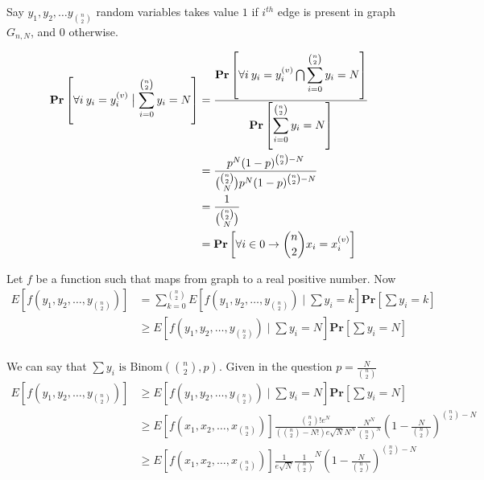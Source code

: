 \documentclass[addpoints,12pt]{exam}
\begin{document}
\begin{questions}
\begin{solution}
                Say $y_1, y_2, \dots y_{\binom{n}{2}}$ random variables takes value $1$ if $i^{th}$ edge is present in graph $G_{n, N}$, and $0$ otherwise.

                \begin{align*}
                    \textbf{Pr}\left[\forall i \: y_i = y_i ^{(v)} \bigm\vert \displaystyle\sum_{i=0} ^{\binom{n}{2}} y_i = N\right] &= \frac{\textbf{Pr}\left[\forall i \: y_i = y_i ^{(v)} \bigcap \displaystyle\sum_{i=0} ^{\binom{n}{2}} y_i = N\right]}{\textbf{Pr}\left[\displaystyle\sum_{i=0} ^{\binom{n}{2}} y_i = N\right]}\\
                    &= \frac{p^N (1 -p)^{\binom{n}{2} - N}}{\binom{\binom{n}{2}}{N} p^N (1-p)^{\binom{n}{2} - N}}\\
                    &= \frac{1}{\binom{\binom{n}{2}}{N}}\\
                    &= \textbf{Pr}\left[\forall i \in {0 \to \binom{n}{2}} x_i = x_i^{(v)}\right]
                \end{align*}

                Let $f$ be a function such that maps from graph to a real positive number. Now
                \begin{align*}
                    E[f(y_1, y_2, \dots, y_{\binom{n}{2}})] &= \displaystyle\sum_{k = 0} ^{\binom{n}{2}} E\left[f(y_1, y_2, \dots, y_{\binom{n}{2}}) \mid \displaystyle\sum y_i = k\right] \textbf{Pr}\left[\displaystyle\sum y_i = k\right]\\
                    &\geq E\left[f(y_1, y_2, \dots, y_{\binom{n}{2}}) \mid \displaystyle\sum y_i = N\right] \textbf{Pr}\left[\displaystyle\sum y_i = N\right]\\
                \end{align*}

                We can say that $\sum y_i \text{ is Binom}(\binom{n}{2}, p)$. Given in the question $p = \frac{N}{\binom{n}{2}}$
                \begin{align*}
                    E\left[f(y_1, y_2, \dots, y_{\binom{n}{2}})\right] &\geq E\left[f(y_1, y_2, \dots, y_{\binom{n}{2}}) \mid \displaystyle\sum y_i = N\right] \textbf{Pr}\left[\displaystyle\sum y_i = N\right]\\
                    &\geq E\left[f(x_1, x_2, \dots, x_{\binom{n}{2}})\right] \frac{\binom{n}{2}! e^N}{\left(\binom{n}{2} - N!\right) e\sqrt{N} N^N} \frac{N^N}{\binom{n}{2}^N} \left(1 - \frac{N}{\binom{n}{2}}\right)^{\binom{n}{2} - N}\\
                    &\geq E\left[f(x_1, x_2, \dots, x_{\binom{n}{2}})\right] \frac{1}{e\sqrt{N}} \frac{1}{\binom{n}{2}}^N \left(1 - \frac{N}{\binom{n}{2}}\right)^{\binom{n}{2} - N}
                \end{align*}


\end{solution}
\end{questions}
\end{document}
